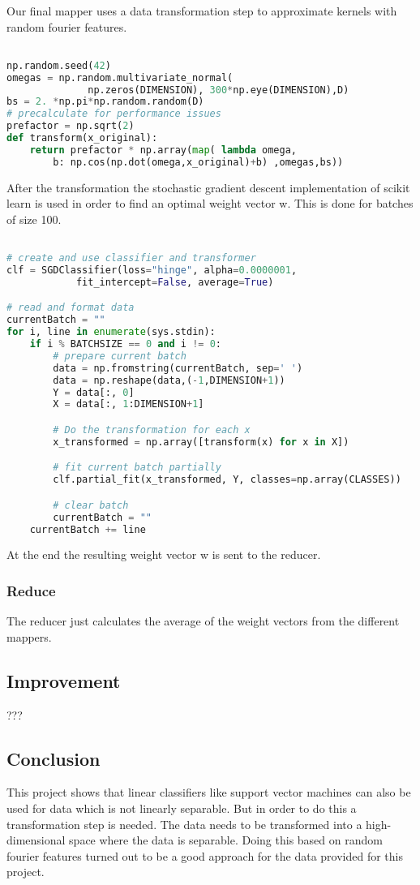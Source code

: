 \documentclass[a4paper, 11pt]{article}
\begin{document}
Our final mapper uses a data transformation step to approximate kernels with random fourier features.

\begin{lstlisting}[language=Python]

np.random.seed(42)
omegas = np.random.multivariate_normal(
              np.zeros(DIMENSION), 300*np.eye(DIMENSION),D)
bs = 2. *np.pi*np.random.random(D)
# precalculate for performance issues
prefactor = np.sqrt(2) 
def transform(x_original):
	return prefactor * np.array(map( lambda omega,
		b: np.cos(np.dot(omega,x_original)+b) ,omegas,bs))

\end{lstlisting}

After the transformation the stochastic gradient descent implementation of scikit learn is used in order to find an optimal weight vector w. This is done for batches of size 100.

\begin{lstlisting}[language=Python]

# create and use classifier and transformer
clf = SGDClassifier(loss="hinge", alpha=0.0000001, 
			fit_intercept=False, average=True)

# read and format data
currentBatch = ""
for i, line in enumerate(sys.stdin):
	if i % BATCHSIZE == 0 and i != 0:
	    # prepare current batch
		data = np.fromstring(currentBatch, sep=' ')
		data = np.reshape(data,(-1,DIMENSION+1))
		Y = data[:, 0]
		X = data[:, 1:DIMENSION+1]

		# Do the transformation for each x
		x_transformed = np.array([transform(x) for x in X])

		# fit current batch partially
		clf.partial_fit(x_transformed, Y, classes=np.array(CLASSES))

		# clear batch
		currentBatch = ""
	currentBatch += line

\end{lstlisting}

At the end the resulting weight vector w is sent to the reducer.

\subsubsection{Reduce}

The reducer just calculates the average of the weight vectors from the different mappers. 

\subsection{Improvement}

???

\subsection{Conclusion}

This project shows that linear classifiers like support vector machines can also be used for data which is not linearly separable. But in order to do this a transformation step is needed. The data needs to be transformed into a high-dimensional space where the data is separable. Doing this based on random fourier features turned out to be a good approach for the data provided for this project.
\end{document}
